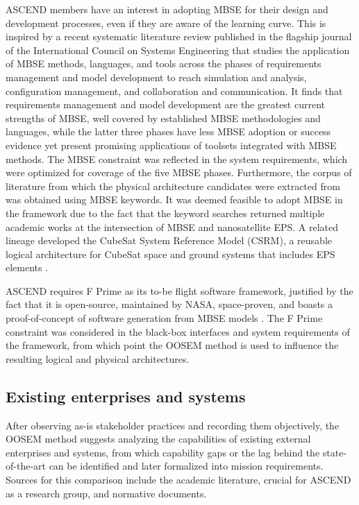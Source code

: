 ASCEND members have an interest in adopting MBSE for their design and development processes, even if they are aware of the learning curve.
This is inspired by a recent systematic literature review published in the flagship journal of the International Council on Systems Engineering \cite{buruso2026modelbased} that studies the application of MBSE methods, languages, and tools across the phases of requirements management and model development to reach simulation and analysis, configuration management, and collaboration and communication. It finds that requirements management and model development are the greatest current strengths of MBSE, well covered by established MBSE methodologies and languages, while the latter three phases have less MBSE adoption or success evidence yet present promising applications of toolsets integrated with MBSE methods.
The MBSE constraint was reflected in the system requirements, which were optimized for coverage of the five MBSE phases.
Furthermore, the corpus of literature from which the physical architecture candidates were extracted from was obtained using MBSE keywords.
It was deemed feasible to adopt MBSE in the framework due to the fact that the keyword searches returned multiple \cite{review-0764, review-0270, review-1563, review-0055} academic works at the intersection of MBSE and nanosatellite EPS. A related lineage developed the CubeSat System Reference Model (CSRM), a reusable logical architecture for CubeSat space and ground systems that includes EPS elements \cite{review-1646,review-1621,review-1494,review-1451,kaslow2019csrm,kaslow2020csrm,review-1051}.

ASCEND requires F Prime as its to-be flight software framework, justified by the fact that it is open-source, maintained by NASA, space-proven, and boasts a proof-of-concept of software generation from MBSE models \cite{review-0853}.
The F Prime constraint was considered in the black-box interfaces and system requirements of the framework, from which point the OOSEM method is used to influence the resulting logical and physical architectures.

\subsection{Existing enterprises and systems}
After observing as-is stakeholder practices and recording them objectively, the OOSEM method suggests analyzing the capabilities of existing external enterprises and systems, from which capability gaps or the lag behind the state-of-the-art can be identified and later formalized into mission requirements.
Sources for this comparison include the academic literature, crucial for ASCEND as a research group, and normative documents.

